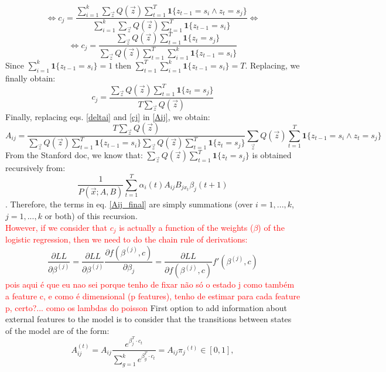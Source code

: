 \documentclass{article}
\begin{document}
\[\Longleftrightarrow c_j =\dfrac{\sum_{i=1}^k \sum_{\Vec{z}}Q(\Vec{z}) \sum_{t=1}^T  \textbf{1}\{z_{t-1}=s_i \wedge z_t=s_j\}}{\sum_{i=1}^k \sum_{\Vec{z}}Q(\Vec{z}) \sum_{t=1}^T  \textbf{1}\{z_{t-1}=s_i\}} \Longleftrightarrow\]
\[\Longleftrightarrow c_j =\dfrac{\sum_{\Vec{z}}Q(\Vec{z}) \sum_{t=1}^T  \textbf{1}\{z_t=s_j\}}{\sum_{\Vec{z}}Q(\Vec{z}) \sum_{t=1}^T  \sum_{i=1}^k \textbf{1}\{z_{t-1}=s_i\}}\]
Since $\sum_{i=1}^k \textbf{1}\{z_{t-1}=s_i\}=1$ then $\sum_{t=1}^T  \sum_{i=1}^k \textbf{1}\{z_{t-1}=s_i\}=T$. Replacing, we finally obtain:
\begin{equation}
     c_j =\dfrac{\sum_{\Vec{z}}Q(\Vec{z}) \sum_{t=1}^T  \textbf{1}\{z_t=s_j\}}{T\sum_{\Vec{z}}Q(\Vec{z})} \label{cj}
\end{equation}
Finally, replacing eqs. \eqref{deltai} and \eqref{cj} in \eqref{Aij}, we obtain:
\begin{equation}
    A_{ij} = \dfrac{T\sum_{\Vec{z}}Q(\Vec{z})}{\sum_{\Vec{z}}Q(\Vec{z}) \sum_{t=1}^T  \textbf{1}\{z_{t-1}=s_i\} \sum_{\Vec{z}}Q(\Vec{z}) \sum_{t=1}^T  \textbf{1}\{z_t=s_j\}} \sum_{\Vec{z}}Q(\Vec{z}) \sum_{t=1}^T  \textbf{1}\{z_{t-1}=s_i \wedge z_t=s_j\}
    \label{Aij_final}
\end{equation}
From the Stanford doc, we know that: $\sum_{\Vec{z}}Q(\Vec{z}) \sum_{t=1}^T  \textbf{1}\{z_t=s_j\}$ is obtained recursively from:
\[\dfrac{1}{P(\Vec{x};A,B)} \sum_{t=1}^T \alpha_i(t) A_{ij} B_{jx_t} \beta_j(t+1)\]. Therefore, the terms in eq. \eqref{Aij_final} are simply summations (over $i=1,...,k$, $j=1,...,k$ or both) of this recursion.
\\ \noindent
\textcolor{red}{However, if we consider that $c_j$ is actually a function of the weights ($\beta$) of the logistic regression, then we need to do the chain rule of derivations:}
\[\dfrac{\partial LL}{\partial \beta^{(j)}}=\dfrac{\partial LL}{\partial \beta^{(j)}}\dfrac{\partial f(\beta^{(j)},c)}{\partial \beta_j} = \dfrac{\partial LL}{\partial f(\beta^{(j)},c)} f'(\beta^{(j)},c) \]
\textcolor{red}{pois aqui é que eu nao sei porque tenho de fixar não só o estado j como também a feature c, e como é dimensional (p features), tenho de estimar para cada feature p, certo?... como os lambdas do poisson}
\fi
First option to add information about external features to the model is to consider that the transitions between states of the model are of the form:
\begin{equation}
    A_{ij}^{(t)} = A_{ij} \dfrac{e^{\beta_{j}^T \cdot c_t}}{\sum_{g=1}^k  e^{\beta_{g}^T\cdot c_t}} =  A_{ij} {\pi_j}^{(t)}\in [0,1],
    \label{old_A_ijt}
\end{equation}
\end{document}
